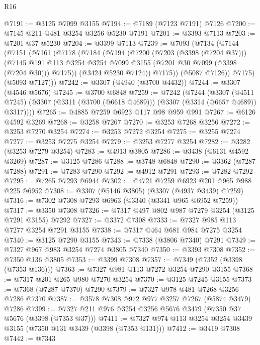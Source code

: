 \begin{lexlean}{R16}
\begin{coremodule}
@7191 := @3125 @7099 @3155
@7194 := @7189 (@7123 @7191) @7126
@7200 := @7145 @211 @481 @3254 @3256 @5230 @7191
@7201 := @3393 @7113
@7203 := @7201 @37 @5230
@7204 := @3399 @7113
@7239 := @7093
    (@7134
      (@7144
        (@7151
          (@7161
            (@7178
              (@7184
                (@7194
                  (@7200
                    (@7203 (@3398 (@7204 @37)))
                    (@7145
                      @191
                      @113
                      @3254
                      @3254
                      @7099
                      @3155
                      (@7201 @30 @7099 (@3398 (@7204 @30)))
                      @7175))
                  (@3424 @5230 @7124))
                @7175))
            (@5087 @7126))
          @7175)
        (@5093 @7127)))
@7242 := @3307 (@4940 (@3700 @4432))
@7244 := @3307 (@4546 @5676)
@7245 := @3700 @6848
@7259 := @7242
    (@7244
      (@3307
        (@4511 @7245)
        (@3307 (@3311 (@3700 (@6618 @4689))) (@3307 (@3314 (@6657 @4689)) @3317))))
@7265 := @4885 @7259 @6923 @117 @98 @959 @991
@7267 := @6126 @4592 @3269
@7268 := @3258 @7267
@7270 := @3253 @7268 @3256
@7272 := @3253 @7270 @3254
@7274 := @3253 @7272 @3254
@7275 := @3255 @7274
@7277 := @3253 @7275 @3254
@7279 := @3253 @7277 @3254
@7282 := @3282 (@3253 @7279 @3254)
@7283 := @4913 @3805
@7286 := @3438 (@6131 @4592 @3269)
@7287 := @3125 @7286
@7288 := @3748 @6848
@7290 := @3362 (@7287 @7288)
@7291 := @7283 @7290
@7292 := @4912 @7291
@7293 := @7282 @7292
@7295 := @7265 @7293 @6944
@7302 := @4721 @7259 @6923 @201 @965 @988 @225 @6952
@7308 := @3307 (@5146 @3805) (@3307 (@4937 @3439) @7259)
@7316 := @7302 @7308 @7293 @6963 (@3340 (@3341 @965 @6952 @7259))
@7317 := @3350 @7308
@7326 := @7317 @497 @802 @987 @7279 @3254 (@3125 @7291 @3155) @7292
@7327 := @3372 @7308
@7333 := @7327 @985 @113 @7277 @3254 @7291 @3155
@7338 := @7317 @464 @681 @984 @7275 @3254
@7340 := @3125 @7290 @3155
@7343 := @7338 (@3806 @7340) @7291
@7349 := @7327 @967 @983 @3254 @7274 @3805 @7340
@7350 := @3393 @7308
@7352 := @7350 @136 @3805
@7353 := @3399 @7308
@7357 := @7349 (@7352 (@3398 (@7353 @136)))
@7363 := @7327 @981 @113 @7272 @3254 @7290 @3155
@7368 := @7317 @201 @265 @980 @7270 @3254
@7370 := @3125 @7245 @3155
@7373 := @7368 (@7287 @7370) @7290
@7379 := @7327 @978 @481 @7268 @3256 @7286 @7370
@7387 := @3578 @7308 @972 @977 @3257 @7267 (@5874 @3479) @7286
@7399 := @7327 @211 @976 @3254 @3256 @5676 @3479 (@7350 @37 @5676 (@3398 (@7353 @37)))
@7411 := @7327 @974 @113 @3254 @3254 @3439 @3155 (@7350 @131 @3439 (@3398 (@7353 @131)))
@7412 := @3419 @7308
@7442 := @7343

\end{coremodule}
\end{lexlean}
